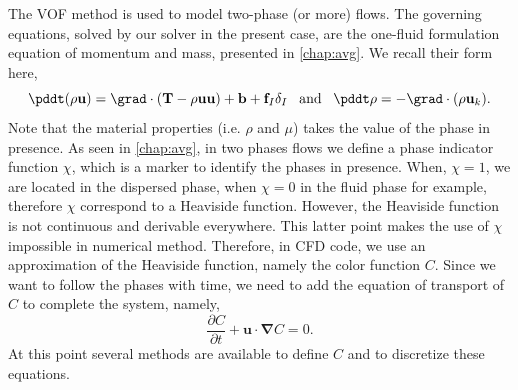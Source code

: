The VOF method is used to model two-phase (or more) flows. 
The governing equations, solved by our solver in the present case, are the one-fluid formulation equation of momentum and mass, presented in \ref{chap:avg}. 
We recall their form here, 
\begin{equation}
    \pddt (\rho \textbf{u})
    = \grad \cdot (\textbf{T} -\rho  \textbf{u} \textbf{u})
    + \textbf{b}
    + \textbf{f}_I\delta_I
    \;\;\;\text{and}\;\;\;
    \pddt \rho
    = 
    - \grad\cdot(\rho\textbf{u}_k). 
\end{equation}
Note that the material properties (i.e. $\rho$ and $\mu$) takes the value of the phase in presence. 
As seen in \ref{chap:avg}, in two phases flows we define a phase indicator function $\chi$, which is a marker to identify the phases in presence.
When, $\chi = 1$, we are located in the dispersed phase, when $\chi = 0$ in the fluid phase for example, therefore $\chi$ correspond to a Heaviside function. 
However, the Heaviside function is not continuous and derivable everywhere. 
This latter point makes the use of $\chi$ impossible in numerical method.
Therefore, in CFD code, we use an approximation of the Heaviside function, namely the color function $C$. 
Since we want to follow the phases with time,  we need to add the equation of transport of $C$ to complete the system, namely,
\begin{equation}
    \frac{\partial C}{\partial t} + \textbf{u}\cdot\bm{\nabla} C = 0.
    \label{eq:cfunc} 
\end{equation}
At this point several methods are available to define $C$ and to discretize these equations. 

